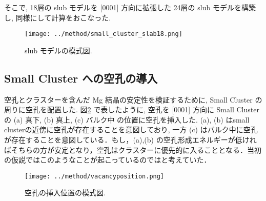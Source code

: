 そこで, 18層の slub モデルを [0001] 方向に拡張した 24層の slub モデルを構築し, 同様にして計算をおこなった.

\begin{figure}[H]
	\begin{center}
		\texttt{[image: ../method/small\_cluster\_slab18.png]}
		\caption{slub モデルの模式図.}
		\label{fig2.3}
	\end{center}
\end{figure}


\subsection{ Small Cluster への空孔の導入}
空孔とクラスターを含んだ Mg 結晶の安定性を検証するために, Small Cluster の周りに空孔を配置した. 図\ref{fig2.4} で表したように, 空孔を [0001] 方向に Small Cluster の (a) 真下, (b) 真上, (c) バルク中 の位置に空孔を挿入した. (a), (b) はsmall clusterの近傍に空孔が存在することを意図しており, 一方 (c) はバルク中に空孔が存在することを意図している．もし，(a),(b) の空孔形成エネルギーが低ければそちらの方が安定となり，空孔はクラスターに優先的に入ることとなる．当初の仮説ではこのようなことが起こっているのではと考えていた．

\begin{figure}[htbp]
	\begin{center}
		\texttt{[image: ../method/vacancyposition.png]}
		\caption{空孔の挿入位置の模式図.}
		\label{fig2.4}
	\end{center}
\end{figure}



